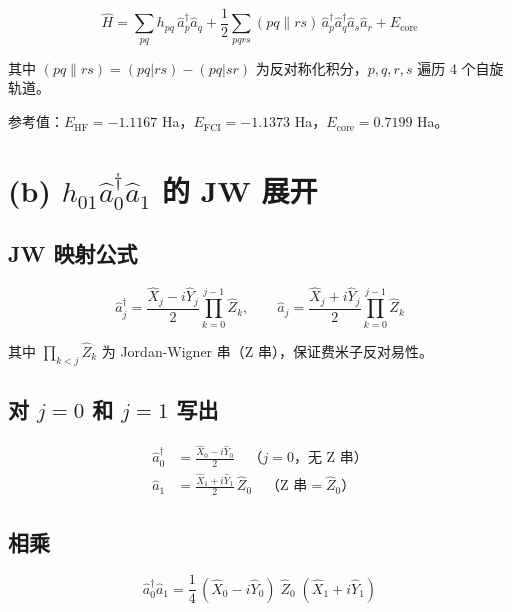\documentclass[11pt,a4paper]{article}
\begin{document}
\begin{equation}
  \boxed{\;
  \hat{H} = \sum_{pq} h_{pq}\, \hat{a}_p^\dagger \hat{a}_q
  + \frac{1}{2}\sum_{pqrs} (pq\|rs)\, \hat{a}_p^\dagger \hat{a}_q^\dagger \hat{a}_s \hat{a}_r
  + E_{\text{core}}\;}
  \label{eq:H}
\end{equation}

其中 $(pq\|rs) = (pq|rs) - (pq|sr)$ 为反对称化积分，$p,q,r,s$ 遍历 4 个自旋轨道。

参考值：$E_{\text{HF}} = -1.1167$ Ha，$E_{\text{FCI}} = -1.1373$ Ha，$E_{\text{core}} = 0.7199$ Ha。

\section{(b) $h_{01}\hat{a}_0^\dagger \hat{a}_1$ 的 JW 展开}

\subsection{JW 映射公式}

\begin{equation}
  \hat{a}_j^\dagger = \frac{\hat{X}_j - i\hat{Y}_j}{2}\prod_{k=0}^{j-1}\hat{Z}_k,
  \qquad
  \hat{a}_j = \frac{\hat{X}_j + i\hat{Y}_j}{2}\prod_{k=0}^{j-1}\hat{Z}_k
  \label{eq:JW}
\end{equation}

其中 $\prod_{k<j}\hat{Z}_k$ 为 Jordan-Wigner 串（Z 串），保证费米子反对易性。

\subsection{对 $j=0$ 和 $j=1$ 写出}

\begin{align}
  \hat{a}_0^\dagger &= \frac{\hat{X}_0 - i\hat{Y}_0}{2} \quad\text{（} j=0\text{，无 Z 串）} \\[6pt]
  \hat{a}_1 &= \frac{\hat{X}_1 + i\hat{Y}_1}{2}\,\hat{Z}_0 \quad\text{（Z 串} = \hat{Z}_0\text{）}
\end{align}

\subsection{相乘}

\begin{equation}
  \hat{a}_0^\dagger \hat{a}_1
  = \frac{1}{4}\,(\hat{X}_0 - i\hat{Y}_0)\;\hat{Z}_0\;(\hat{X}_1 + i\hat{Y}_1)
  \label{eq:a0a1}
\end{equation}
\end{document}
